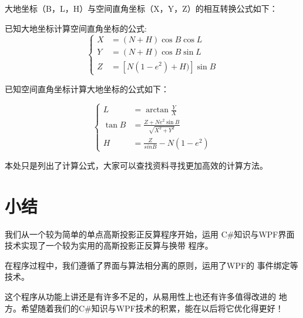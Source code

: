 大地坐标（B，L，H）与空间直角坐标（X，Y，Z）的相互转换公式如下：

已知大地坐标计算空间直角坐标的公式:
\[
\left \{ \begin{aligned}
X &= (N+H) \cos B \cos L \\
Y &= (N+H) \cos B \sin L \\
Z &= [N(1 - e^2) + H)] \sin B 
\end{aligned} \right.
\]

已知空间直角坐标计算大地坐标的公式如下：

\[
\left \{ \begin{aligned}
L &= \arctan \frac{Y}{X} \\
\tan B &= \frac{Z + Ne^2 \sin B}{\sqrt{X^2 + Y^2}} \\
H &= \frac{Z}{sinB} - N(1-e^2) 
\end{aligned} \right.
\]

本处只是列出了计算公式，大家可以查找资料寻找更加高效的计算方法。

\section*{小结}

我们从一个较为简单的单点高斯投影正反算程序开始，运用
C\#知识与WPF界面技术实现了一个较为实用的高斯投影正反算与换带
程序。

在程序过程中，我们遵循了界面与算法相分离的原则，运用了WPF的
事件绑定等技术。

这个程序从功能上讲还是有许多不足的，从易用性上也还有许多值得改进的
地方。希望随着我们的C\#知识与WPF技术的积累，能在以后将它优化得更好！

